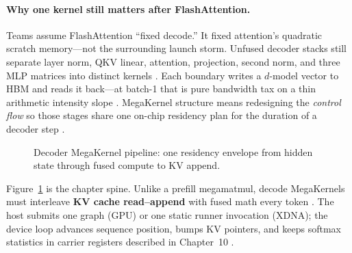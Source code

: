 \paragraph{Why one kernel still matters after FlashAttention.} Teams assume FlashAttention ``fixed decode.'' It fixed attention's quadratic scratch memory---not the surrounding launch storm. Unfused decoder stacks still separate layer norm, QKV linear, attention, projection, second norm, and three MLP matrices into distinct kernels \citep{dao2022flashattention,dao2023flashdecoding}. Each boundary writes a $d$-model vector to HBM and reads it back---at batch-1 that is pure bandwidth tax on a thin arithmetic intensity slope \citep{dlbook,memoryfloor2026}. MegaKernel structure means redesigning the \emph{control flow} so those stages share one on-chip residency plan for the duration of a decoder step \citep{chen2020compilerbasedhardw,taxbreak2026}.


\begin{figure}[t]
\centering
{}
\caption{Decoder MegaKernel pipeline: one residency envelope from hidden state through fused compute to KV append.}
\label{fig:megakernel_structure_pipeline}
\end{figure}

Figure~\ref{fig:megakernel_structure_pipeline} is the chapter spine. Unlike a prefill megamatmul, decode MegaKernels must interleave \textbf{KV cache read--append} with fused math every token \citep{kwon2023vllm,patel2025llminference}. The host submits one graph (GPU) or one static runner invocation (XDNA); the device loop advances sequence position, bumps KV pointers, and keeps softmax statistics in carrier registers described in Chapter~10 \citep{nvidia2024cudagraphs,amd2024xdna}.

